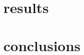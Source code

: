 \documentclass[prc,amsmath,twocolumn,superscriptaddress]{revtex4}
\begin{document}

\section{results}
\label{results}


\section{conclusions}
\label{conc}





\end{document}
